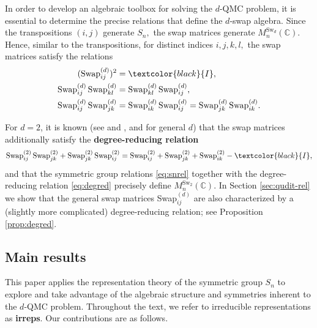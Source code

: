 \documentclass[12pt,dvipsnames,accepted=2016-08-18,a4paper,onecolumn]{quantumarticle}
\numberwithin{equation}{section}
\theoremstyle{definition}
\begin{document}
In order to develop an algebraic toolbox for solving the $d$-QMC problem, it is essential to determine the precise relations that define the $d$-swap algebra.
 Since the transpositions $(i,j)$ generate $S_n,$ the swap matrices generate $M^{\text{Sw}_d}_n(\mathbb{C}).$ Hence, similar to the transpositions, for distinct indices $i,j,k,l,$ the swap matrices satisfy the relations
	\begin{equation}\label{eq:snrel}
	\begin{split}
		(\text{Swap}^{(d)}_{ij})^2 &= \textcolor{black}{I}, \\
		\text{Swap}^{(d)}_{ij}\,\text{Swap}^{(d)}_{kl} &= \text{Swap}^{(d)}_{kl}\,\text{Swap}^{(d)}_{ij},\\
		\text{Swap}^{(d)}_{ij}\,\text{Swap}^{(d)}_{jk} &= \text{Swap}^{(d)}_{ik}\,\text{Swap}^{(d)}_{ij} = \text{Swap}^{(d)}_{jk}\,\text{Swap}^{(d)}_{ik}.\\
	\end{split}
\end{equation}


For $d=2$, 
it is known (see \cite[Theorem 3.6]{BCEHK24} and \cite[Theorem 3.8]{TRZ}, and \cite[Theorem 11.6.1]{Probook} for general $d$) 
that
the swap matrices additionally satisfy the \textbf{degree-reducing relation}
\begin{equation}\label{eq:degred}
    \text{Swap}^{(2)}_{ij} \,\text{Swap}^{(2)}_{jk} + \text{Swap}^{(2)}_{jk} \,\text{Swap}^{(2)}_{ij} = \text{Swap}^{(2)}_{ij}+\text{Swap}^{(2)}_{jk}+\text{Swap}^{(2)}_{ik} -\textcolor{black}{I},
\end{equation}
and that the symmetric group relations \eqref{eq:snrel} together with the degree-reducing relation \eqref{eq:degred} precisely define $M^{\text{Sw}_2}_n(\mathbb{C}).$ In Section \ref{sec:qudit-rel} we show that the general swap matrices Swap$_{ij}^{(d)}$ are also characterized by a (slightly more complicated) degree-reducing relation;
see 
Proposition \ref{prop:degred}.


\subsection{Main results}

This paper applies the representation theory of the symmetric group $S_n$ to explore and take advantage of the algebraic structure and symmetries inherent to the $d$-QMC problem. 
Throughout the text, we refer to irreducible representations as \textbf{irreps}.
Our contributions are as follows.
\end{document}
